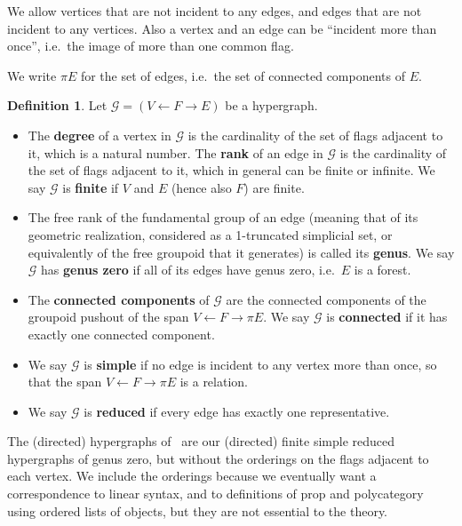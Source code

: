 \documentclass{article}
\theoremstyle{definition}
\newtheorem{defn}[thm]{Definition}
\theoremstyle{remark}
\def\G{\mathcal{G}}
\let\ot\leftarrow
\begin{document}
We allow vertices that are not incident to any edges, and edges that are not incident to any vertices.
Also a vertex and an edge can be ``incident more than once'', i.e.\ the image of more than one common flag.

We write $\pi E$ for the set of edges, i.e.\ the set of connected components of $E$.

\begin{defn}
  Let $\G=(V\ot F\to E)$ be a hypergraph.
  \begin{itemize}
  \item The \textbf{degree} of a vertex in $\G$ is the cardinality of the set of flags adjacent to it, which is a natural number.
    The \textbf{rank} of an edge in $\G$ is the cardinality of the set of flags adjacent to it, which in general can be finite or infinite.
    We say $\G$ %
    is \textbf{finite} if $V$ and $E$ (hence also $F$) are finite.
  \item The free rank of the fundamental group of an edge (meaning that of its geometric realization, considered as a 1-truncated simplicial set, or equivalently of the free groupoid that it generates) is called its \textbf{genus}.
    We say $\G$ has \textbf{genus zero} if all of its edges have genus zero, i.e.\ $E$ is a forest.
  \item The \textbf{connected components} of $\G$ are the connected components of the groupoid pushout of the span $V \leftarrow F \to \pi E$.
    We say $\G$ is \textbf{connected} if it has exactly one connected component.
  \item We say $\G$ is \textbf{simple} if no edge is incident to any vertex more than once, so that the span $V \ot F \to \pi E$ is a relation.
  \item We say $\G$ is \textbf{reduced} if every edge has exactly one representative.
  \end{itemize}
\end{defn}

The (directed) hypergraphs of~\cite{glpn:directed-hypergraphs} are our (directed) finite simple reduced hypergraphs of genus zero, but without the orderings on the flags adjacent to each vertex.
We include the orderings because we eventually want a correspondence to linear syntax, and to definitions of prop and polycategory using ordered lists of objects, but they are not essential to the theory.
\end{document}
